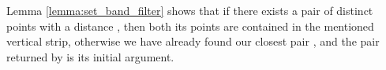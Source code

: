 \begin{isabellebody}
\begin{isamarkuptext}
\vskip 10pt
\begin{adjustwidth}{-15pt}{0pt}
\begin{quote}
 \vskip 0pt
\end{quote}
\end{adjustwidth}
\vskip 10pt

Lemma \ref{lemma:set_band_filter} shows that if there exists a pair  of distinct points with a distance \isa{{\isacharless}\ {\isasymdelta}}, then
both its points are contained in the mentioned vertical strip, otherwise we have already found our closest pair
, and the pair returned by  is its initial argument.


\end{isamarkuptext}
\end{isabellebody}
